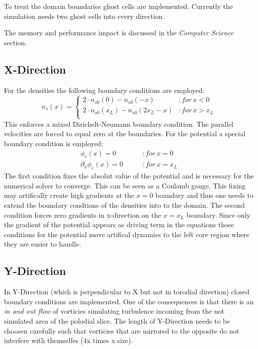 \documentclass[master.tex]{subfiles}
\begin{document}
To treat the domain boundaries ghost cells are implemented. Currently the simulation needs two ghost cells into every direction.

 The memory and performance impact is discussed in the \textit{Computer Science} section.
\subsection{X-Direction}
For the densities the following boundary conditions are employed:
\begin{equation}
    n_s(x) = \begin{cases}
        2 \cdot n_{s0}(0) - n_{s0}(-x) &\colon for \, x < 0 \\
        2 \cdot n_{s0}(x_L) - n_{s0}(2x_L-x) &\colon for \, x > x_L \\
    \end{cases}
\end{equation}
This enforces a mixed Dirichelt-Neumann boundary condition.
The parallel velocities are forced to equal zero at the boundaries.
For the potential a special boundary condition is employed:
\begin{align}
    \phi_e(x) = 0 \qquad &\colon for \, x = 0\\
    \partial_x\phi_e(x) = 0 \qquad &\colon for \, x = x_L \label{eq:boundary-potential-right}
\end{align}
The first condition fixes the absolut value of the potential and is necessary for the numerical solver to converge. This can be seen as a Coulomb gauge. This fixing may artifically create high gradients at the $x=0$ boundary and thus one needs to extend the boundary condtions of the densities into to the domain. The second condition forces zero gradients in x-direction on the $x=x_L$ boundary. Since only the gradient of the potential appears as driving term in the equations those conditions for the potential move artifical dynamics to the left core region where they are easier to handle. 

\subsection{Y-Direction}
In Y-Direction (which is perpendicular to X but not in torodial direction) closed boundary conditions are implemented. One of the consequences is that there is an \textit{in and out flow} of vorticies simulating turbulence incoming from the not simulated area of the polodial slice. The length of Y-Direction needs to be choosen carefully such that vorticies that are mirrored to the opposite do not interfere with themselfes (4x times x size).
\end{document}
